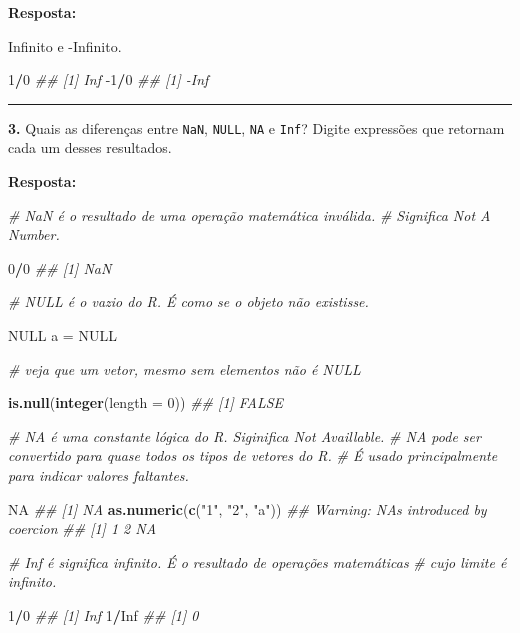 \documentclass[
]{book}
\newenvironment{Shaded}{\begin{snugshade}}{\end{snugshade}}
\newcommand{\CommentTok}[1]{\textcolor[rgb]{0.56,0.35,0.01}{\textit{#1}}}
\newcommand{\DataTypeTok}[1]{\textcolor[rgb]{0.13,0.29,0.53}{#1}}
\newcommand{\DecValTok}[1]{\textcolor[rgb]{0.00,0.00,0.81}{#1}}
\newcommand{\KeywordTok}[1]{\textcolor[rgb]{0.13,0.29,0.53}{\textbf{#1}}}
\newcommand{\NormalTok}[1]{#1}
\newcommand{\OperatorTok}[1]{\textcolor[rgb]{0.81,0.36,0.00}{\textbf{#1}}}
\newcommand{\OtherTok}[1]{\textcolor[rgb]{0.56,0.35,0.01}{#1}}
\newcommand{\StringTok}[1]{\textcolor[rgb]{0.31,0.60,0.02}{#1}}
\begin{document}
\textbf{Resposta:}

Infinito e -Infinito.

\begin{Shaded}
\begin{Highlighting}[]
\DecValTok{1}\OperatorTok{/}\DecValTok{0}
\CommentTok{## [1] Inf}
\DecValTok{-1}\OperatorTok{/}\DecValTok{0}
\CommentTok{## [1] -Inf}
\end{Highlighting}
\end{Shaded}

\begin{center}\rule{0.5\linewidth}{0.5pt}\end{center}

\textbf{3.} Quais as diferenças entre \texttt{NaN}, \texttt{NULL}, \texttt{NA} e \texttt{Inf}? Digite expressões que retornam cada um desses resultados.

\textbf{Resposta:}

\begin{Shaded}
\begin{Highlighting}[]
\CommentTok{# NaN é o resultado de uma operação matemática inválida. }
\CommentTok{# Significa Not A Number.}

\DecValTok{0}\OperatorTok{/}\DecValTok{0}
\CommentTok{## [1] NaN}
\end{Highlighting}
\end{Shaded}

\begin{Shaded}
\begin{Highlighting}[]
\CommentTok{# NULL é o vazio do R. É como se o objeto não existisse.}

\OtherTok{NULL}
\NormalTok{a =}\StringTok{ }\OtherTok{NULL}
\end{Highlighting}
\end{Shaded}

\begin{Shaded}
\begin{Highlighting}[]
\CommentTok{# veja que um vetor, mesmo sem elementos não é NULL}

\KeywordTok{is.null}\NormalTok{(}\KeywordTok{integer}\NormalTok{(}\DataTypeTok{length =} \DecValTok{0}\NormalTok{)) }
\CommentTok{## [1] FALSE}

\CommentTok{# NA é uma constante lógica do R. Siginifica Not Availlable. }
\CommentTok{# NA pode ser convertido para quase todos os tipos de vetores do R. }
\CommentTok{# É usado principalmente para indicar valores faltantes.}

\OtherTok{NA}
\CommentTok{## [1] NA}
\KeywordTok{as.numeric}\NormalTok{(}\KeywordTok{c}\NormalTok{(}\StringTok{"1"}\NormalTok{, }\StringTok{"2"}\NormalTok{, }\StringTok{"a"}\NormalTok{))}
\CommentTok{## Warning: NAs introduced by coercion}
\CommentTok{## [1]  1  2 NA}

\CommentTok{# Inf é significa infinito. É o resultado de operações matemáticas }
\CommentTok{# cujo limite é infinito.}

\DecValTok{1}\OperatorTok{/}\DecValTok{0}
\CommentTok{## [1] Inf}
\DecValTok{1}\OperatorTok{/}\OtherTok{Inf}
\CommentTok{## [1] 0}
\end{Highlighting}
\end{Shaded}
\end{document}
